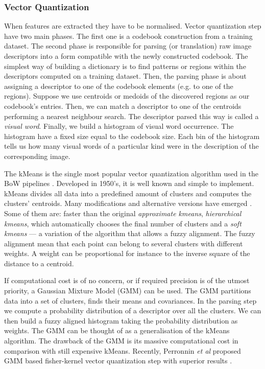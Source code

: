 \documentclass[11pt,twoside]{article}
\begin{document}
  \subsubsection{Vector Quantization}
    When features are extracted they have to be normalised. Vector quantization step have two main phases. The first one is a codebook construction from a training dataset. The second phase is responsible for parsing (or translation) raw image descriptors into a form compatible with the newly constructed codebook. The simplest way of building a dictionary is to find patterns or regions within the descriptors computed on a training dataset. Then, the parsing phase is about assigning a descriptor to one of the codebook elements (e.g. to one of the regions). Suppose we use centroids or medoids of the discovered regions as our codebook's entries. Then, we can match a descriptor to one of the centroids performing a nearest neighbour search. The descriptor parsed this way is called a \textit{visual word}. Finally, we build a histogram of visual word occurrence. The histogram have a fixed size equal to the codebook size. Each bin of the histogram tells us how many visual words of a particular kind were in the description of the corresponding image.
    
    The kMeans is the single most popular vector quantization algorithm used in the BoW pipelines \cite{tsai2012bag}. Developed in 1950's, it is well known and simple to implement. kMeans divides all data into a predefined amount of clusters and computes the clusters' centroids. Many modifications and alternative versions have emerged \cite{kmeans_jain2010data}. Some of them are: faster than the original \emph{approximate kmeans}, \emph{hierarchical kmeans}, which automatically chooses the final number of clusters and a \emph{soft kmeans} --- a variation of the algorithm that allows a fuzzy alignment. The fuzzy alignment mean that each point can belong to several clusters with different weights. A weight can be proportional for instance to the inverse square of the distance to a centroid. 
    
    If computational cost is of no concern, or if required precision is of the utmost priority, a Gaussian Mixture Model (GMM) can be used. The GMM partitions data into a set of clusters, finds their means and covariances. In the parsing step we compute a probability distribution of a descriptor over all the clusters. We can then build a fuzzy aligned histogram taking the probability distribution as weights. The GMM can be thought of as a generalisation of the kMeans algorithm. The drawback of the GMM is its massive computational cost in comparison with still expensive kMeans. Recently, Perronnin \textit{et al} proposed GMM based fisher-kernel vector quantization step with superior results \cite{fisher1, fisher2}.		
    
\end{document}
